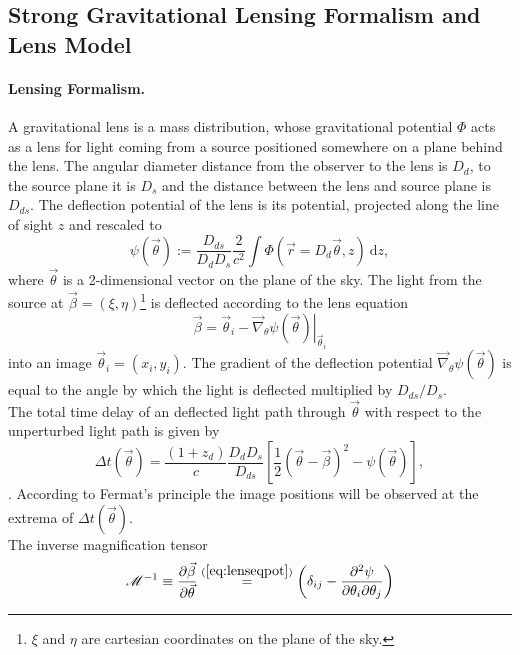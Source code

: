\subsection{Strong Gravitational Lensing Formalism and Lens Model} \label{sec:lensing_theo}

\paragraph{Lensing Formalism.} A gravitational lens is a mass distribution, whose gravitational potential $\Phi$ acts as a lens for light coming from a source positioned somewhere on a plane behind the lens. The angular diameter distance from the observer to the lens is $D_d$, to the source plane it is $D_s$ and the distance between the lens and source plane is $D_{ds}$. The deflection potential of the lens is its potential, projected along the line of sight $z$ and rescaled to
\begin{equation}
\psi(\vec{\theta}) := \frac{D_{ds}}{D_d D_s} \frac{2}{c^2} \int \Phi(\vec{r}=D_d \vec{\theta},z) {\ \mathrm d} z, \label{eq:psidef}
\end{equation}
where $\vec{\theta}$ is a 2-dimensional vector on the plane of the sky. The light from the source at $\vec{\beta} = (\xi,\eta)$\footnote{$\xi$ and $\eta$ are cartesian coordinates on the plane of the sky.} is deflected according to the lens equation
\begin{equation}
\vec{\beta} = \vec{\theta}_i - \left.\vec{\nabla}_\theta \psi(\vec{\theta})\right|_{\vec{\theta}_i} \label{eq:lenseqpot}
\end{equation}
into an image $\vec{\theta}_i = (x_i,y_i)$. The gradient of the deflection potential $\vec{\nabla}_\theta \psi(\vec{\theta})$ is equal to the angle by which the light is deflected multiplied by $D_{ds}/D_{s}$.
\\The total time delay of an deflected light path through $\vec{\theta}$ with respect to the unperturbed light path is given by 
\begin{equation}
\Delta t(\vec{\theta}) = \frac{(1+z_d)}{c} \frac{D_d D_s}{D_{ds}} \left[ \frac 12 (\vec{\theta} - \vec{\beta})^2 - \psi(\vec{\theta})\right], \label{eq:timedelay}
\end{equation}
\citep{BartGravLens}. According to Fermat's principle the image positions will be observed at the extrema of $\Delta t(\vec{\theta})$.
\\The inverse magnification tensor
\begin{equation}
\mathscr{M}^{-1} \equiv \frac{\partial \vec{\beta}}{\partial \vec{\theta}} \overset{(\ref{eq:lenseqpot})}{=} \left(\delta_{ij} - \frac{\partial^2 \psi}{\partial \theta_i \partial \theta_j} \right)\label{eq:magnificationtensor}
\end{equation}
